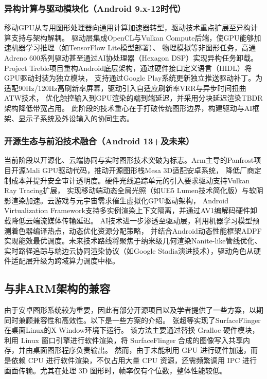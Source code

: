 \subsubsection{异构计算与驱动模块化（Android 9.x-12时代）​}

移动GPU从专用图形处理器向通用计算加速器转型，驱动技术重点扩展至异构计算支持与架构解耦。
驱动层集成OpenCL与Vulkan Compute后端，使GPU能够加速机器学习推理（如TensorFlow Lite模型部署\cite{tflite_gpu}）、
物理模拟等非图形任务，高通Adreno 600系列驱动甚至通过AI协处理器（Hexagon DSP\cite{codrescu2014hexagon}）实现异构任务卸载。
Project Treble项目重构Android底层架构\cite{treble}，通过硬件接口定义语言（HIDL）将GPU驱动封装为独立模块\cite{hidl}，
支持通过Google Play系统更新独立推送驱动补丁。为适配90Hz/120Hz高刷新率屏幕，驱动引入自适应刷新率VRR\cite{AndroidARR}与异步时间扭曲ATW技术，
优化触控输入到GPU渲染的端到端延迟，并采用分块延迟渲染TBDR\cite{焦继业2015移动图形处理器的现状}架构降低带宽占用。
此阶段的技术重心在于打破传统图形边界，构建驱动与AI框架、显示子系统及外设输入的协同生态。

\subsubsection{开源生态与前沿技术融合（Android 13+及未来）​​}

当前阶段以开源化、云端协同与实时图形技术突破为标志。Arm主导的Panfrost项目\cite{panfrost}开源Mali GPU驱动代码，推动开源图形栈Mesa 3D适配安卓系统\cite{mesa}，
降低厂商定制成本并提升安全审计透明度。硬件光线追踪单元的引入要求驱动支持Vulkan Ray Tracing扩展\cite{vulkan_raytracing}，
实现移动端动态全局光照（如UE5 Lumen技术简化版\cite{tan2024mastering}）与软阴影渲染加速。云游戏与元宇宙需求催生虚拟化GPU驱动架构，
Android Virtualization Framework支持多实例渲染上下文隔离，并通过AV1编解码硬件卸载降低云端流媒体传输延迟\cite{avf}。
AI技术进一步渗透至驱动层，利用机器学习模型预测着色器编译热点，动态优化资源分配策略，
并结合Android动态性能框架ADPF\cite{android_boost}实现能效最优调度。未来技术路线将聚焦于纳米级几何渲染Nanite\cite{diaz2023nanite}-like管线优化、
实时路径追踪与端边云协同渲染协议（如Google Stadia\cite{google_stadia}演进技术），驱动角色从硬件适配层升级为跨域算力调度中枢。

\subsection{与非ARM架构的兼容}
由于安卓图形系统较为重要，因此有部分开源项目以及学者提供了一些方案，以期同时兼顾兼容性和高效性。以下是一些方案的介绍。
张超等实现了SurfaceFlinger在桌面Linux的X Window环境下运行\cite{张超2012Android}。
该方法主要通过替换 Gralloc 硬件模块，利用 Linux 窗口引擎进行软件渲染，将 SurfaceFlinger 合成的图像写入共享内存，并由桌面图形程序负责输出。
然而，由于未能利用 GPU 进行硬件加速，而是依赖 CPU 进行软件渲染，不仅占用大量 CPU 资源，还需频繁调用 IPC 进行画面传输。尤其在处理 3D 图形时，帧率仅有个位数，整体性能较低。

